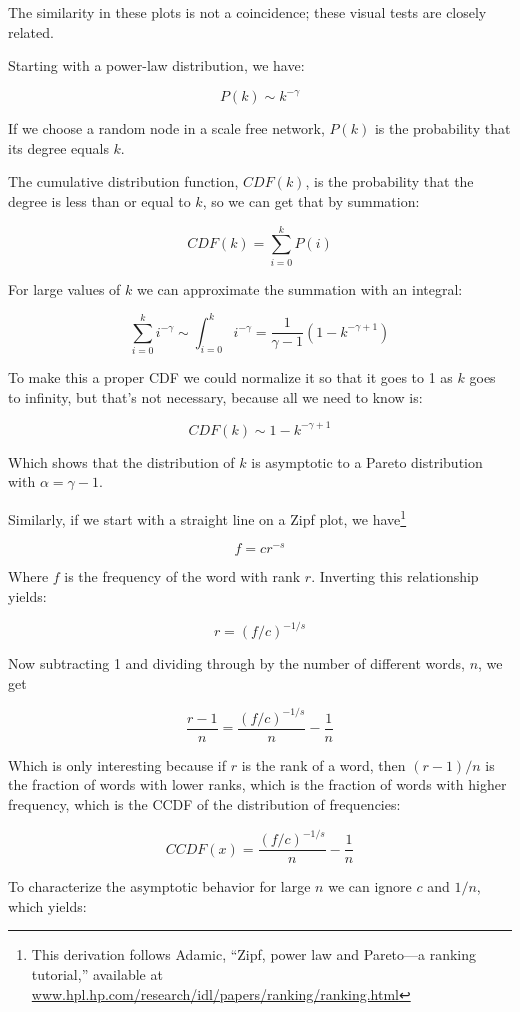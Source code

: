 \documentclass[10pt]{book}
\begin{document}
The similarity in these plots is not a coincidence; these
visual tests are closely related.

Starting with a power-law distribution, we have:

\[ P(k) \sim k^{- \gamma} \]

If we choose a random node in a scale free network,
$P(k)$ is the probability that its degree equals $k$.

The cumulative distribution function, $CDF(k)$, is the probability
that the degree is less than or equal to $k$, so we can
get that by summation:

\[ CDF(k) = \sum_{i=0}^k P(i) \]

For large values of $k$ we can approximate the summation with
an integral:

\[ \sum_{i=0}^k i^{- \gamma} \sim \int_{i=0}^k i^{- \gamma} =
\frac{1}{\gamma -1} (1 - k^{-\gamma + 1}) \]

To make this a proper CDF we could normalize it so that it
goes to 1 as $k$ goes to infinity, but that's not necessary,
because all we need to know is:

\[ CDF(k) \sim 1 - k^{-\gamma + 1} \]

Which shows that the distribution of $k$ is asymptotic to a
Pareto distribution with $\alpha = \gamma - 1$.

Similarly, if we start with a straight line on a Zipf plot,
we have\footnote{This derivation follows
Adamic, ``Zipf, power law and
Pareto---a ranking tutorial,'' available at
\url{www.hpl.hp.com/research/idl/papers/ranking/ranking.html}}

\[ f = c r^{-s} \]

Where $f$ is the frequency of the word with rank $r$.  Inverting
this relationship yields:

\[ r = (f/c)^{-{1/s}} \]

Now subtracting 1 and dividing through by the number of different
words, $n$, we get

\[ \frac{r-1}{n} = \frac{(f/c)^{-{1/s}}}{n} - \frac{1}{n} \]

Which is only interesting because if $r$ is the rank of a word,
then $(r-1)/n$ is the fraction of words with lower ranks, which is
the fraction of words with higher frequency, which is the
CCDF of the distribution of frequencies:

\[ CCDF(x) = \frac{(f/c)^{-{1/s}}}{n} - \frac{1}{n} \]

To characterize the asymptotic behavior
for large $n$ we can ignore $c$ and $1/n$, which yields:
\end{document}
